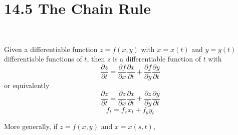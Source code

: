 \documentclass[12pt]{exam}
\newcommand{\qdate}{14.5 The Chain Rule} %
\newcommand{\pd}[2]{\dfrac{\partial #1}{\partial #2}}
\begin{document}
\section*{\qdate}





\begin{info}
~

    \noindent 
    Given a differentiable function \(z=f(x,y)\) with \(x=x(t)\) and \(y=y(t)\)
    differentiable functions of \(t\), then \(z\) is a differentiable function of \(t\) with
    \[
        \frac{\partial z}{\partial t}=\pd{f}{x}\pd{x}{t}+\pd{f}{y}\pd{y}{t}
    \]
    or equivalently
    \[
        \pd{z}{t}=\pd{z}{x}\pd{x}{t}+\pd{z}{y}\pd{y}{t}
    \]
    \[
        f_t = f_x x_t + f_y y_t
    \]

    \noindent More generally, if \(z=f(x,y)\) and \(x=x(s,t)\), 
\end{info}
\end{document}
